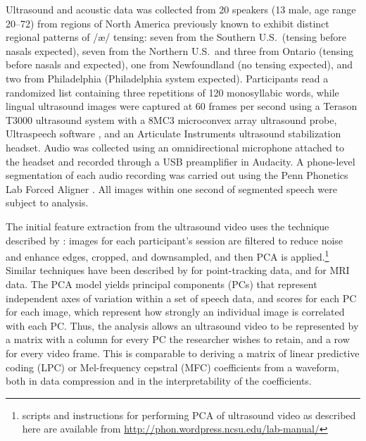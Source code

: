\documentclass[output=paper]{LSP/langsci}
\begin{document}
Ultrasound and acoustic data was collected from 20 speakers (13 male, age range 20--72) from regions of North America previously known to exhibit distinct regional patterns of /æ/ tensing: seven from the Southern U.S.~(tensing before nasals expected), seven from the Northern U.S.~and three from Ontario (tensing before nasals and  expected), one from Newfoundland (no tensing expected), and two from Philadelphia (Philadelphia system expected). Participants read a randomized list containing three repetitions of 120 monosyllabic words, while lingual ultrasound images were captured at 60 frames per second using a Terason T3000 ultrasound system with a 8MC3 microconvex array ultrasound probe, Ultraspeech software \citep{hueber_eigentongue_2007}, and an Articulate Instruments ultrasound stabilization headset.  Audio was collected using an omnidirectional microphone attached to the headset and recorded through a USB preamplifier in Audacity. A phone-level segmentation of each audio recording was carried out using the Penn Phonetics Lab Forced Aligner \citep{yuan_speaker_2008}. All images within one second of segmented speech were subject to analysis.

The initial feature extraction from the ultrasound video uses the technique described by \citet{hueber_eigentongue_2007}: images for each participant's session are filtered to reduce noise and enhance edges, cropped, and downsampled, and then PCA is applied.\footnote{ scripts and instructions for performing PCA of ultrasound video as described here are available from \href{http://phon.wordpress.ncsu.edu/lab-manual/}{http://phon.wordpress.ncsu.edu/lab-manual/}}  Similar techniques have been described by \citet{story_time_2007} for point-tracking data, and \citet{carignan_real-time_2015} for MRI data.  The PCA model yields principal components (PCs) that represent independent axes of variation within a set of speech data, and scores for each PC for each image, which represent how strongly an individual image is correlated with each PC. Thus, the analysis allows an ultrasound video to be represented by a matrix with a column for every PC the researcher wishes to retain, and a row for every video frame.  This is comparable to deriving a matrix of linear predictive coding (LPC) or Mel-frequency cepstral (MFC) coefficients from a waveform, both in data compression and in the interpretability of the coefficients. 
\end{document}
